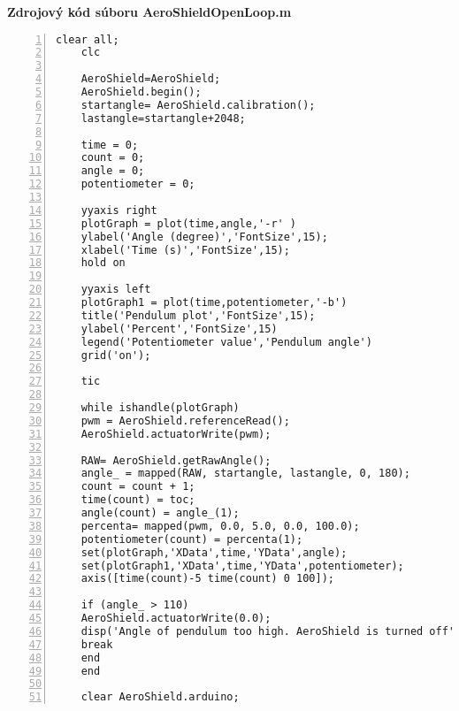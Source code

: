 \LARGE\bf{Zdrojový kód súboru AeroShieldOpenLoop.m}
\label{AeroShieldOpenLoop.m}
\vspace{1cm}
\begin{lstlisting}[numbers=left,basicstyle=\scriptsize,caption={Zdrojový kód súboru AeroShieldOpenLoop.m.},captionpos=b]	
	clear all;
	clc 
	
	AeroShield=AeroShield;
	AeroShield.begin();
	startangle= AeroShield.calibration(); 
	lastangle=startangle+2048;
	
	time = 0;
	count = 0;
	angle = 0;
	potentiometer = 0;
	
	yyaxis right  
	plotGraph = plot(time,angle,'-r' )
	ylabel('Angle (degree)','FontSize',15);
	xlabel('Time (s)','FontSize',15); 
	hold on  
	
	yyaxis left 
	plotGraph1 = plot(time,potentiometer,'-b')
	title('Pendulum plot','FontSize',15);
	ylabel('Percent','FontSize',15)  
	legend('Potentiometer value','Pendulum angle')
	grid('on');
	
	tic    
	
	while ishandle(plotGraph)  
	pwm = AeroShield.referenceRead();
	AeroShield.actuatorWrite(pwm);
	
	RAW= AeroShield.getRawAngle();  
	angle_ = mapped(RAW, startangle, lastangle, 0, 180);
	count = count + 1;  
	time(count) = toc;      
	angle(count) = angle_(1);   
	percenta= mapped(pwm, 0.0, 5.0, 0.0, 100.0); 
	potentiometer(count) = percenta(1);          
	set(plotGraph,'XData',time,'YData',angle);   
	set(plotGraph1,'XData',time,'YData',potentiometer);
	axis([time(count)-5 time(count) 0 100]);  
	
	if (angle_ > 110)                         
	AeroShield.actuatorWrite(0.0);    
	disp('Angle of pendulum too high. AeroShield is turned off')
	break                              
	end
	end             
	
	clear AeroShield.arduino;
\end{lstlisting}
